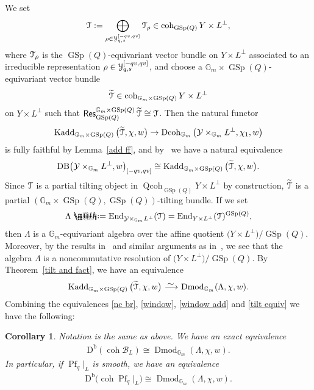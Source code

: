 \documentclass[pdftex]{sigma}%
\makeatletter
\newtheorem{cor}[dfn]{Corollary}
\newcommand*{\defeq}{\mathrel{\rlap{%
 \raisebox{0.3ex}{$\m@th\cdot$}}%
 \raisebox{-0.3ex}{$\m@th\cdot$}}%
 =}
\numberwithin{equation}{section}
\newcommand{\Kadd}{\operatorname{Kadd}}
\newcommand{\Dmod}{\operatorname{Dmod}}
\newcommand{\Dcoh}{\operatorname{Dcoh}}
\newcommand{\End}{\operatorname{End}}
\newcommand{\coh}{\operatorname{coh}}
\newcommand{\Qcoh}{\operatorname{Qcoh}}
\newcommand{\Db}{\operatorname{D^b}}
\newcommand{\Pf}{\operatorname{Pf}}
\newcommand{\GSp}{\operatorname{GSp}}
\newcommand{\Res}{\operatorname{\sf Res}}
\newcommand{\cB}{\mathcal{B}}
\newcommand{\cY}{\mathcal{Y}}
\newcommand{\bG}{\mathbb{G}}
\newcommand{\scrT}{\EuScript{T}}
\newcommand{\scrY}{\EuScript{Y}}
\newcommand{\simto}{\,\,\,\,\raisebox{4pt}{$\sim$}{\kern -1.1em \longrightarrow}\,}
\newcommand{\rest}{\!|_L}
\makeatother
\begin{document}
We set
\begin{gather*}
\scrT:=\bigoplus_{\rho \in \scrY^{[-qv,qv]}_{q,s}} \scrT_{\rho}\in \coh_{\GSp(Q)}Y\times L^{\perp},
\end{gather*}
where $\scrT_{\rho}$ is the $\GSp(Q)$-equivariant vector bundle on $Y\times L^{\perp}$ associated to an irreducible representation $\rho\in\scrY^{[-qv,qv]}_{q,s}$, and choose a $\bG_m\times \GSp(Q)$-equivariant vector bundle
\begin{gather*}
\widetilde{\scrT}\in \coh_{\bG_m\times \GSp(Q)}Y\times L^{\perp}
\end{gather*}
on $Y\times L^{\perp}$ such that $\Res^{\bG_m\times \GSp(Q)}_{\GSp(Q)}\widetilde{\scrT}\cong \scrT$. Then the natural functor
\begin{gather*}
\Kadd_{\bG_m\times \GSp(Q)}\big(\widetilde{\scrT},\chi,w\big)\to \Dcoh_{\bG_m}\big(\cY\times_{\bG_m}L^{\perp},\chi_1,w\big)
\end{gather*}
is fully faithful by Lemma~\ref{add ff}, and by~\cite[Lemma~2.8]{rs} we have a natural equivalence
\begin{equation}\label{window add}
 {\rm DB}\big(\cY\times_{\bG_m}L^{\perp},w\big)_{[-qv,qv]}\cong \Kadd_{\bG_m\times \GSp(Q)}\big(\widetilde{\scrT},\chi,w\big).
\end{equation}
Since $\scrT$ is a partial tilting object in $\Qcoh _{\GSp(Q)}Y\times L^{\perp}$ by construction, $\widetilde{\scrT}$ is a partial $(\bG_m\times \GSp(Q),\GSp(Q))$-tilting bundle. If we set
\begin{gather*}
\Lambda\defeq\End_{\cY\times_{\bG_m}L^{\perp}}(\scrT)=\End_{Y\times L^{\perp}}(\scrT)^{\GSp(Q)},
\end{gather*}
then $\Lambda$ is a $\bG_m$-equivariant algebra over the affine quotient $\big(Y\times L^{\perp}\big)/\GSp(Q)$. Moreover, by the results in~\cite[Section~1.5]{svdb} and similar arguments as in~\cite[Section~5]{svdb}, we see that the algebra $\Lambda$ is a noncommutative resolution of $\big(Y\times L^{\perp}\big)/\GSp(Q)$.
By Theorem~\ref{tilt and fact}, we have an equivalence
\begin{gather}\label{tilt equiv}
\Kadd_{\bG_m\times \GSp(Q)}\big(\widetilde{\scrT},\chi,w\big)\simto\Dmod_{\bG_m}(\Lambda, \chi,w).
\end{gather}
Combining the equivalences \eqref{nc br}, \eqref{window}, \eqref{window add} and \eqref{tilt equiv} we have the following:

\begin{cor}\label{main cor}
Notation is the same as above. We have an exact equivalence
\begin{gather*}
\Db(\coh \cB_L)\cong \Dmod_{\bG_m}(\Lambda, \chi,w).
\end{gather*}
In particular, if $\Pf_q\rest$ is smooth, we have an equivalence
\begin{gather*}
\Db\big(\coh \Pf_q\rest\big)\cong \Dmod_{\bG_m}(\Lambda, \chi,w).
\end{gather*}
\end{cor}
\end{document}
